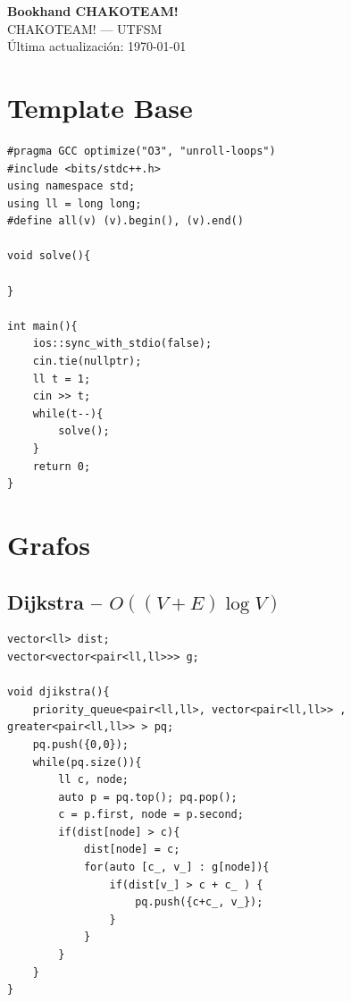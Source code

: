 \documentclass[10pt,a4paper,twocolumn]{article}
\begin{document}
	
	\begin{center}
		{\LARGE \textbf{Bookhand CHAKOTEAM!}} \\[4pt]
		{\large CHAKOTEAM! --- UTFSM} \\[2pt]
		{\small \'Ultima actualizaci\'on: \today}
	\end{center}
	
	\tableofcontents
	\vspace{0.5cm}
	
	\section{Template Base}
	
	\begin{lstlisting}[style=cpp, title={template.cpp}]
#pragma GCC optimize("O3", "unroll-loops")
#include <bits/stdc++.h>
using namespace std;
using ll = long long;
#define all(v) (v).begin(), (v).end()

void solve(){
	
}

int main(){
	ios::sync_with_stdio(false);
	cin.tie(nullptr);
	ll t = 1;
	cin >> t;
	while(t--){
		solve();
	}
	return 0;
}
	\end{lstlisting}
	
	\section{Grafos}
	
	\subsection{Dijkstra -- $O((V+E) \log V)$}
	
	\begin{lstlisting}[style=cpp, title={dijkstra.cpp}]
vector<ll> dist;
vector<vector<pair<ll,ll>>> g;

void djikstra(){
	priority_queue<pair<ll,ll>, vector<pair<ll,ll>> , greater<pair<ll,ll>> > pq;
	pq.push({0,0});
	while(pq.size()){
		ll c, node;
		auto p = pq.top(); pq.pop();
		c = p.first, node = p.second;
		if(dist[node] > c){
			dist[node] = c;
			for(auto [c_, v_] : g[node]){
				if(dist[v_] > c + c_ ) {
					pq.push({c+c_, v_});
				}
			}
		}
	}
}
\end{lstlisting}
	
\end{document}
